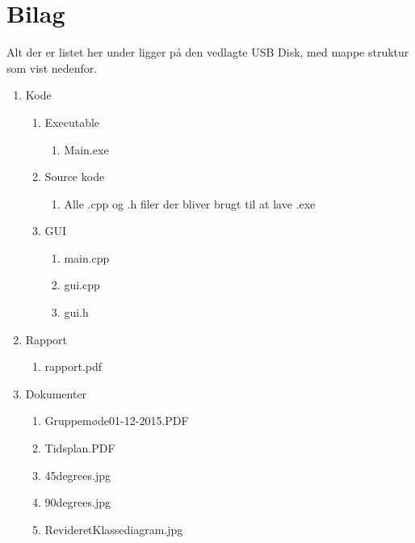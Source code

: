 \appendix
\section{Bilag} \hfill
Alt der er listet her under ligger på den vedlagte USB Disk, med mappe struktur som vist nedenfor.
\label{sec:bilag}
\begin{enumerate}[noitemsep]
	\item Kode
	\begin{enumerate}[noitemsep]
		\item Executable
		\begin{enumerate}[noitemsep]
			\item Main.exe
		\end{enumerate}
		\item Source kode
		\begin{enumerate}[noitemsep]
			\item Alle .cpp og .h filer der bliver brugt til at lave .exe
		\end{enumerate}
		\item GUI
		\begin{enumerate}[noitemsep]
			\item main.cpp
			\item gui.cpp
			\item gui.h
		\end{enumerate}
	\end{enumerate}
	\item Rapport
	\begin{enumerate}[noitemsep]
		\item rapport.pdf
	\end{enumerate}
	\item Dokumenter
	\begin{enumerate}[noitemsep]
		\item Gruppemøde01-12-2015.PDF \label{itm:Modereferat1}
		\item Tidsplan.PDF \label{itm:Tidsplan1}
		\item 45degrees.jpg \label{itm:45deg}
		\item 90degrees.jpg \label{itm:90deg}
		\item RevideretKlassediagram.jpg \label{itm:Klassediagramv3}
	\end{enumerate}
\end{enumerate}